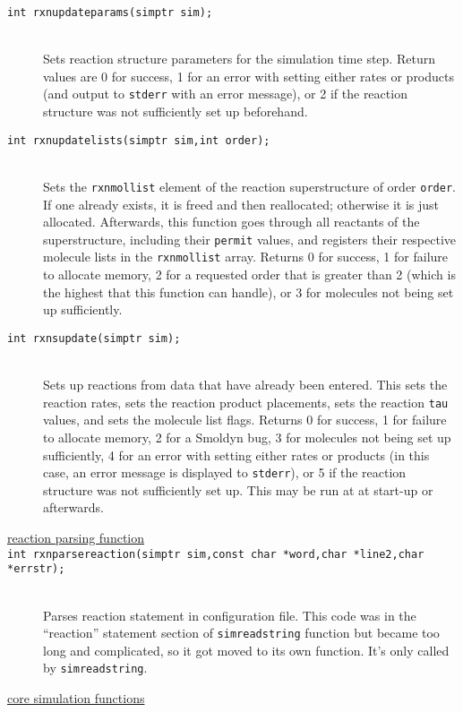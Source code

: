 \documentclass {book}
\begin{document}
\begin{description}
\item[\texttt{int rxnupdateparams(simptr sim);}]
\hfill \\
Sets reaction structure parameters for the simulation time step.  Return values are 0 for success, 1 for an error with setting either rates or products (and output to \texttt{stderr} with an error message), or 2 if the reaction structure was not sufficiently set up beforehand.

\item[\texttt{int rxnupdatelists(simptr sim,int order);}]
\hfill \\
Sets the \texttt{rxnmollist} element of the reaction superstructure of order \texttt{order}.  If one already exists, it is freed and then reallocated; otherwise it is just allocated.  Afterwards, this function goes through all reactants of the superstructure, including their \texttt{permit} values, and registers their respective molecule lists in the \texttt{rxnmollist} array.  Returns 0 for success, 1 for failure to allocate memory, 2 for a requested order that is greater than 2 (which is the highest that this function can handle), or 3 for molecules not being set up sufficiently.

\item[\texttt{int rxnsupdate(simptr sim);}]
\hfill \\
Sets up reactions from data that have already been entered.  This sets the reaction rates, sets the reaction product placements, sets the reaction \texttt{tau} values, and sets the molecule list flags.  Returns 0 for success, 1 for failure to allocate memory, 2 for a Smoldyn bug, 3 for molecules not being set up sufficiently, 4 for an error with setting either rates or products (in this case, an error message is displayed to \texttt{stderr}), or 5 if the reaction structure was not sufficiently set up.  This may be run at at start-up or afterwards.

\item[\underline{reaction parsing function}]

\item[\texttt{int rxnparsereaction(simptr sim,const char *word,char *line2,char *errstr);}]
\hfill \\
Parses reaction statement in configuration file.  This code was in the ``reaction'' statement section of \texttt{simreadstring} function but became too long and complicated, so it got moved to its own function.  It's only called by \texttt{simreadstring}.

\item[\underline{core simulation functions}]


\end{description}
\end{document}
